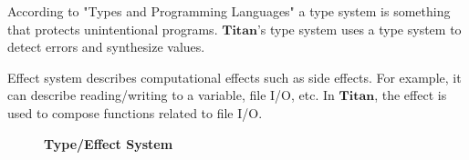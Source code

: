 \documentclass[12pt, a4paper, titlepage]{report}
\begin{document}
      According to "Types and Programming Languages" a \cite{pierce:2002} type system is something that protects unintentional programs.
      $\mathbf{Titan}$'s type system uses a type system to detect errors and synthesize values.

      Effect system describes computational effects such as side effects.
      For example, it can describe reading/writing to a variable, file I/O, etc.
      In $\mathbf{Titan}$, the effect is used to compose functions related to file I/O.

      \begin{figure}[htbp]
        \begin{flushleft}
          \textbf{Type/Effect System} \quad {}
        \end{flushleft}
        \centering
\end{figure}
\end{document}
